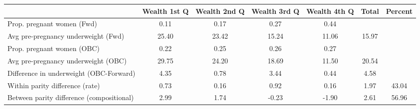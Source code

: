 \begin{tabular}{l*{6}{c}}
\toprule
            &\multicolumn{1}{c}{Wealth 1st Q}&\multicolumn{1}{c}{Wealth 2nd Q}&\multicolumn{1}{c}{Wealth 3rd Q}&\multicolumn{1}{c}{Wealth 4th Q}&\multicolumn{1}{c}{Total}&\multicolumn{1}{c}{Percent}\\
\midrule
\midrule
Prop. pregnant women (Fwd)&        0.11&        0.17&        0.27&        0.44&            &            \\
Avg pre-pregnancy underweight (Fwd)&       25.40&       23.42&       15.24&       11.06&       15.97&            \\
Prop. pregnant women (OBC)&        0.22&        0.25&        0.26&        0.27&            &            \\
Avg pre-pregnancy underweight (OBC)&       29.75&       24.20&       18.69&       11.50&       20.54&            \\
Difference in underweight (OBC-Forward)&        4.35&        0.78&        3.44&        0.44&        4.58&            \\
Within parity difference (rate)&        0.73&        0.16&        0.92&        0.16&        1.97&       43.04\\
Between parity difference (compositional)&        2.99&        1.74&       -0.23&       -1.90&        2.61&       56.96\\
\bottomrule
\end{tabular}
